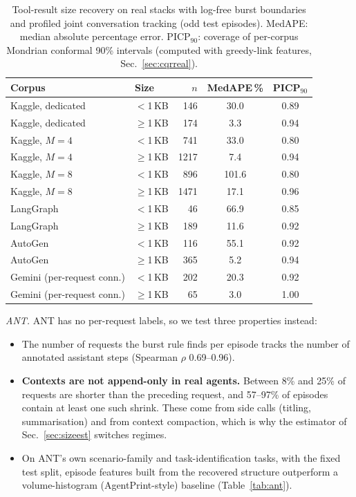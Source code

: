 \begin{table}[t]\centering\caption{Tool-result size recovery on real stacks with log-free burst boundaries and profiled joint conversation tracking (odd test episodes). MedAPE: median absolute percentage error. PICP$_{90}$: coverage of per-corpus Mondrian conformal 90\% intervals (computed with greedy-link features, Sec.~\ref{sec:cqrreal}).}\label{tab:realsize}
\small\setlength{\tabcolsep}{4pt}
\begin{tabular}{llrcc}\toprule Corpus & Size & $n$ & MedAPE\,\% & PICP$_{90}$\\\midrule
Kaggle, dedicated & $<$1\,KB & 146 & 30.0 & 0.89 \\
Kaggle, dedicated & $\geq$1\,KB & 174 & 3.3 & 0.94 \\
Kaggle, $M{=}4$ & $<$1\,KB & 741 & 33.0 & 0.80 \\
Kaggle, $M{=}4$ & $\geq$1\,KB & 1217 & 7.4 & 0.94 \\
Kaggle, $M{=}8$ & $<$1\,KB & 896 & 101.6 & 0.80 \\
Kaggle, $M{=}8$ & $\geq$1\,KB & 1471 & 17.1 & 0.96 \\
LangGraph & $<$1\,KB & 46 & 66.9 & 0.85 \\
LangGraph & $\geq$1\,KB & 189 & 11.6 & 0.92 \\
AutoGen & $<$1\,KB & 116 & 55.1 & 0.92 \\
AutoGen & $\geq$1\,KB & 365 & 5.2 & 0.94 \\
Gemini (per-request conn.) & $<$1\,KB & 202 & 20.3 & 0.92 \\
Gemini (per-request conn.) & $\geq$1\,KB & 65 & 3.0 & 1.00 \\
\bottomrule\end{tabular}\end{table}

\emph{ANT.} ANT has no per-request labels, so we test three properties instead:
\begin{itemize}
\item The number of requests the burst rule finds per episode tracks the number of annotated assistant steps (Spearman $\rho$ 0.69--0.96).
\item \textbf{Contexts are not append-only in real agents.} Between 8\% and 25\% of requests are shorter than the preceding request, and 57--97\% of episodes contain at least one such shrink. These come from side calls (titling, summarisation) and from context compaction, which is why the estimator of Sec.~\ref{sec:sizeest} switches regimes.
\item On ANT's own scenario-family and task-identification tasks, with the fixed test split, episode features built from the recovered structure outperform a volume-histogram (AgentPrint-style) baseline (Table~\ref{tab:ant}).
\end{itemize}

